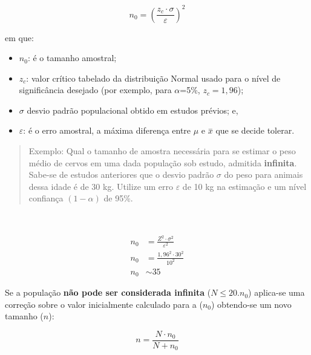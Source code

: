 \documentclass[
]{book}
\providecommand{\tightlist}{%
  \setlength{\itemsep}{0pt}\setlength{\parskip}{0pt}}
\begin{document}
\hfill\break

\[
n_{0} = \left( \frac{z_{c} \cdot \sigma}{\varepsilon} \right)^{2}
\]

\hfill\break

em que:

\hfill\break

\begin{itemize}
\tightlist
\item
  \(n_{0}\): é o tamanho amostral;\\
\item
  \(z_{c}\): valor crítico tabelado da distribuição Normal usado para o nível de significância desejado (por exemplo, para \(\alpha\)=5\%, \(z_{c}=1,96\));\\
\item
  \(\sigma\) desvio padrão populacional obtido em estudos prévios; e,\\
\item
  \(\varepsilon\): é o erro amostral, a máxima diferença entre \(\mu\) e \(\stackrel{-}{x}\) que se decide tolerar.
\end{itemize}

\hfill\break

\begin{quote}
Exemplo: Qual o tamanho de amostra necessária para se estimar o peso médio de cervos em uma dada população sob estudo, admitida \textbf{infinita}. Sabe-se de estudos anteriores que o desvio padrão \(\sigma\) do peso para animais dessa idade é de 30 kg. Utilize um erro \(\varepsilon\) de 10 kg na estimação e um nível confiança \((1-\alpha)\) de 95\%.
\end{quote}

~

\begin{align*}
n_{0} & = \frac{Z^{2} \cdot \sigma^{2}}{\varepsilon^{2}} \\
n_{0} & = \frac{1,96^{2} \cdot 30^{2}}{10^{2}} \\
n_{0} & \sim 35 
\end{align*}

\hfill\break

Se a população \textbf{não pode ser considerada infinita} (\(N \le 20.n_{0}\)) aplica-se uma correção sobre o valor inicialmente calculado para a (\(n_{0}\)) obtendo-se um novo tamanho (\(n\)):

\hfill\break

\[
n=\frac{N \cdot n_{0}}{N + n_{0}}
\]

\hfill\break
\end{document}
